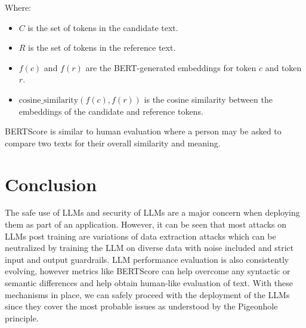 \documentclass[12pt]{article}
\newcommand{\tab}{\hspace*{2em}} %
\begin{document}
\begin{itemize}
        Where:
        \begin{itemize}
            \item \( C \) is the set of tokens in the candidate text.
            \item \( R \) is the set of tokens in the reference text.
            \item \( f(c) \) and \( f(r) \) are the BERT-generated embeddings for token \( c \) and token \( r \).
            \item \( \text{cosine\_similarity}(f(c), f(r)) \) is the cosine similarity between the embeddings of the candidate and reference tokens.
        \end{itemize}


        BERTScore is similar to human evaluation where a person may be asked to compare two texts for their overall similarity and meaning.
    \end{itemize}


    \section{Conclusion}
    \tab The safe use of LLMs and security of LLMs are a major concern when deploying them as part of an application. However, it can be seen that most attacks on LLMs post training are variations of data extraction attacks which can be neutralized by training the LLM on diverse data with noise included and strict input and output guardrails.
    LLM performance evaluation is also consistently evolving, however metrics like BERTScore can help overcome any syntactic or semantic differences and help obtain human-like evaluation of text. With these mechanisms in place, we can safely proceed with the deployment of the LLMs since they cover the most probable issues as understood by the Pigeonhole principle.
\end{document}

